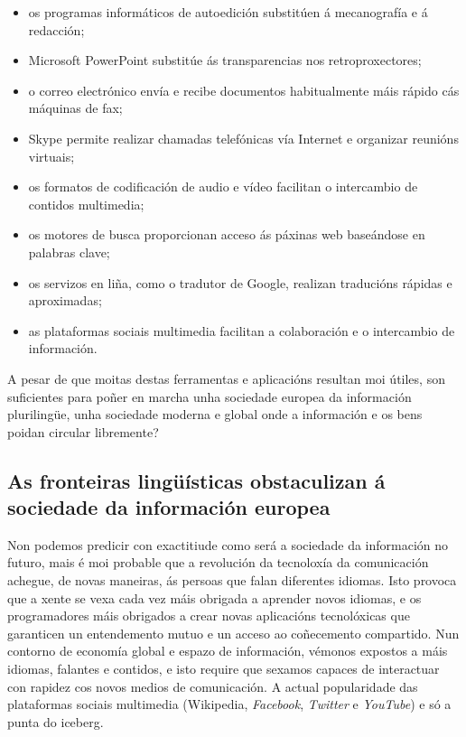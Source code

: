 \begin{multicols}{2}
\begin{itemize}
\item os programas informáticos de autoedición substitúen á mecanografía e á redacción;
\item Microsoft PowerPoint substitúe ás transparencias nos retroproxectores;
\item o correo electrónico envía e recibe documentos habitualmente máis rápido cás máquinas de fax; 
\item Skype permite realizar chamadas telefónicas vía Internet e organizar reunións virtuais;
\item os formatos de codificación de audio e vídeo facilitan o intercambio de contidos multimedia;
\item os motores de busca proporcionan acceso ás páxinas web baseándose en palabras clave;
\item os servizos en liña, como o tradutor de Google, realizan traducións rápidas e aproximadas;
\item as plataformas sociais multimedia facilitan a colaboración e o intercambio de información.
\end{itemize}

A pesar de que moitas destas ferramentas e aplicacións resultan moi útiles, son suficientes para poñer en marcha unha sociedade europea da información plurilingüe, unha sociedade moderna e global onde a información e os bens poidan circular libremente?

\subsection{As fronteiras lingüísticas obstaculizan á sociedade da  información europea}

  Non podemos predicir con exactitiude como será a sociedade da información no futuro, mais é moi probable que a revolución da tecnoloxía da comunicación achegue, de novas maneiras, ás persoas que falan diferentes idiomas. Isto provoca que a xente se vexa cada vez máis obrigada a aprender novos idiomas, e os programadores máis obrigados a crear novas aplicacións tecnolóxicas que garanticen un entendemento mutuo e un acceso ao coñecemento compartido. Nun contorno de economía global e espazo de información, vémonos expostos a máis idiomas, falantes e contidos, e isto require que sexamos capaces de interactuar con rapidez cos novos medios de comunicación. A actual popularidade das plataformas sociais multimedia (Wikipedia,  \textit{Facebook}, \textit{Twitter}  e \textit{YouTube}) e só a punta do iceberg.


\end{multicols}
